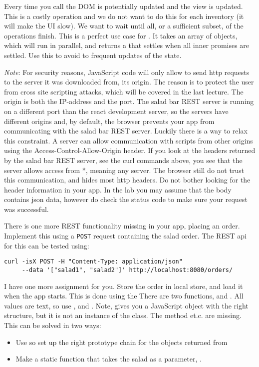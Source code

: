 \documentclass[fleqn, article, a4paper]{memoir}
\begin{document}
\begin{Assignments}
Every time you call  the DOM is potentially updated and the view is updated. This is a costly operation and we do not want to do this for each inventory (it will make the UI slow). We want to wait until all, or a sufficient subset, of the  operations finish. This is a perfect use case for . It takes an array of  objects, which will run in parallel, and returns a  that settles when all inner promises are settled. Use this to avoid to frequent updates of the state.

\emph{Note}: For security reasons, JavaScript code will only allow to send http requests to the server it was downloaded from, its origin. The reason is to protect the user from cross site scripting attacks, which will be covered in the last lecture. The origin is both the IP-address and the port. The salad bar REST server is running on a different port than the react development server, so the servers have different origins and, by default, the browser prevents your app from communicating with the salad bar REST server. Luckily there is a way to relax this constraint. A server can allow communication with scripts from other origins using the Access-Control-Allow-Origin header. If you look at the headers returned by the salad bar REST server, see the curl commands above, you see that the server allows access from *, meaning any server. The browser still do not trust this communication, and hides most http headers. Do not bother looking for the header information in your app. In the lab you may assume that the body contains json data, however do check the status code to make sure your request was successful.

\item There is one more REST functionality missing in your app, placing an order. Implement this using a \texttt{POST} request containing the salad order. The REST api for this can be tested using:
\\ \noindent \begin{verbatim}
curl -isX POST -H "Content-Type: application/json"
     --data '["salad1", "salad2"]' http://localhost:8080/orders/
\end{verbatim}

\item I have one more assignment for you. Store the order in local store, and load it when the app starts. This is done using the  There are two functions,  and . All values are text, so use , and . Note,  gives you a JavaScript object with the right structure, but it is not an instance of the  class. The  method et.c. are missing. This can be solved in two ways:
\begin{itemize}
\item Use  so set up the right prototype chain for the objects returned from 
\item Make a static function that takes the salad as a parameter, .
\end{itemize}
\end{Assignments}


\end{document}

